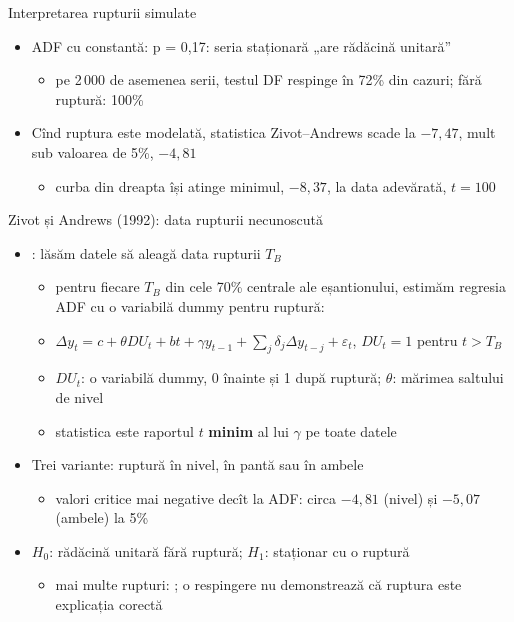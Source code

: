 \begin{frame}{Interpretarea rupturii simulate}
\itemsize{\small}
\begin{itemize}
    \item ADF cu constantă: p = 0{,}17: seria staționară „are rădăcină unitară”
    \begin{itemize}
        \item pe 2\,000 de asemenea serii, testul DF respinge în 72\% din cazuri; fără ruptură: 100\%
    \end{itemize}
    \item Cînd ruptura este modelată, statistica Zivot--Andrews scade la $\ensuremath{-}7{,}47$, mult sub valoarea de 5\%, $\ensuremath{-}4{,}81$
    \begin{itemize}
        \item curba din dreapta își atinge minimul, $\ensuremath{-}8{,}37$, la data adevărată, $t = 100$
    \end{itemize}
\end{itemize}
\end{frame}

\begin{frame}{Zivot și Andrews (1992): data rupturii necunoscută}
\itemsize{\small}
\begin{itemize}
    \item {}: lăsăm datele să aleagă data rupturii $T_B$
    \begin{itemize}
        \item pentru fiecare $T_B$ din cele 70\% centrale ale eșantionului, estimăm regresia ADF cu o variabilă dummy pentru ruptură:
        \item $\Delta y_t = c + \theta DU_t + bt + \gamma y_{t-1} + \sum_j\delta_j\Delta y_{t-j} + \varepsilon_t$, $DU_t = 1$ pentru $t > T_B$
        \item $DU_t$: o variabilă dummy, 0 înainte și 1 după ruptură; $\theta$: mărimea saltului de nivel
        \item statistica este raportul $t$ \textbf{minim} al lui $\gamma$ pe toate datele
    \end{itemize}
    \item Trei variante: ruptură în nivel, în pantă sau în ambele
    \begin{itemize}
        \item valori critice mai negative decît la ADF: circa $-4{,}81$ (nivel) și $-5{,}07$ (ambele) la 5\%
    \end{itemize}
    \item $H_0$: rădăcină unitară fără ruptură; $H_1$: staționar cu o ruptură
    \begin{itemize}
        \item mai multe rupturi: ; o respingere nu demonstrează că ruptura este explicația corectă
    \end{itemize}
\end{itemize}
\end{frame}

